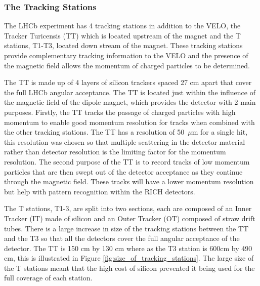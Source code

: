 


\subsubsection{The Tracking Stations} 
\label{Tracking_Stations}
The LHCb experiment has 4 tracking stations in addition to the VELO, the Tracker Turicensis (TT) which is located upstream of the magnet and the T stations, T1-T3, located down stream of the magnet. These tracking stations provide complementary tracking information to the VELO and the presence of the magnetic field allows the momentum of charged particles to be determined. 



The TT is made up of 4 layers of silicon trackers spaced 27 cm apart that cover the full LHCb angular acceptance. The TT is located just within the influence of the magnetic field of the dipole magnet, which provides the detector with 2 main purposes. Firstly, the TT tracks the passage of charged particles with high momentum to enable good momentum resolution for tracks when combined with the other tracking stations. The TT has a resolution of 50~$\mu$m for a single hit, this resolution was chosen so that multiple scattering in the detector material rather than detector resolution is the limiting factor for the momentum resolution. The second purpose of the TT is to record tracks of low momentum particles that are then swept out of the detector acceptance as they continue through the magnetic field. These tracks will have a lower momentum resolution but help with pattern recognition within the RICH detectors. 


The T stations, T1-3, are split into two sections, each are composed of an Inner Tracker (IT) made of silicon and an Outer Tracker (OT) composed of straw drift tubes. 
There is a large increase in size of the tracking stations between the TT and the T3 so that all the detectors cover the full angular acceptance of the detector.  The TT is 150 cm by 130 cm where as the T3 station is 600cm by 490 cm, this is illustrated in Figure \ref{fig:size_of_tracking_stations}. The large size of the T stations meant that the high cost of silicon prevented it being used for the full coverage of each station.

